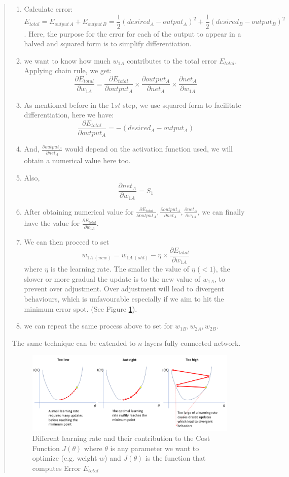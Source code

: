 \begin{quote}
	\begin{enumerate}
		\item Calculate error: $$E_{total}=E_{output\,A}+E_{output\,B}=\frac{1}{2}(desired_A-output_A)^2+\frac{1}{2}(desired_B-output_B)^2$$. Here, the purpose for the error for each of the output to appear in a halved and squared form is to simplify differentiation.
		\item we want to know how much $w_{1A}$ contributes to the total error $E_{total}$. Applying chain rule, we get:$$\frac{\partial E_{total}}{\partial w_{1A}}=\frac{\partial E_{total}}{\partial output_A}\times \frac{\partial output_A}{\partial net_A}\times \frac{\partial net_A}{\partial w_{1A}}$$
		\item As mentioned before in the $1st$ step, we use squared form to facilitate differentiation, here we have: $$\frac{\partial E_{total}}{\partial output_A}=-(desired_A-output_A)$$
		\item And, $\frac{\partial output_A}{\partial net_A}$ would depend on the activation function used, we will obtain a numerical value here too.
		\item Also, $$\frac{\partial net_A}{\partial w_{1A}}=S_1$$
		\item After obtaining numerical value for $\frac{\partial E_{total}}{\partial output_A}, \frac{\partial output_A}{\partial net_A}, \frac{\partial net_A}{\partial w_{1A}}$, we can finally have the value for $\frac{\partial E_{total}}{\partial w_{1A}}$.
		\item We can then proceed to set $$w_{1A\,(new)}=w_{1A\,(old)}-\eta\times \frac{\partial E_{total}}{\partial w_{1A}}$$ where $\eta$ is the learning rate. The smaller the value of $\eta$ ($<1$), the slower or more gradual the update is to the new value of $w_{1A}$, to prevent over adjustment. Over adjustment will lead to divergent behaviours, which is unfavourable especially if we aim to hit the minimum error spot. (See Figure \ref{fig:lrate}).
		\item we can repeat the same process above to set for $w_{1B},w_{2A},w_{2B}$.
	\end{enumerate}
	The same technique can be extended to $n$ layers fully connected network.
	\begin{figure}[H]
		\centering
		\includegraphics[scale=0.35]{lrate.png}
		\caption{Different learning rate and their contribution to the Cost Function $J(\theta)$ where $\theta$ is any parameter we want to optimize (e.g. weight $w$) and $J(\theta)$ is the function that computes Error $E_{total}$ \cite{lrate}}
		\label{fig:lrate}
	\end{figure}
\end{quote}
